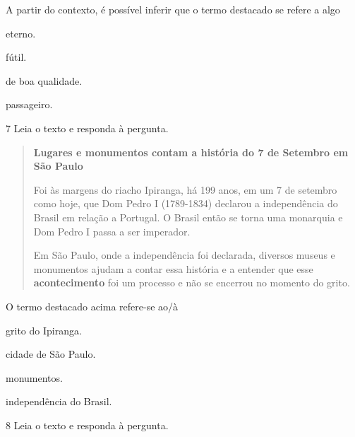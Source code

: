 A partir do contexto, é possível inferir que o termo destacado se
refere a algo

\begin{escolha}
  \item eterno.

  \item fútil.

  \item de boa qualidade.

  \item passageiro.
\end{escolha}

\pagebreak
\num{7} Leia o texto e responda à pergunta.

\begin{quote}
\textbf{Lugares e monumentos contam a história do 7 de Setembro em São
Paulo}

Foi às margens do riacho Ipiranga, há 199 anos, em um 7 de setembro como
hoje, que Dom Pedro I (1789-1834) declarou a independência do Brasil em
relação a Portugal. O Brasil então se torna uma monarquia e Dom Pedro I
passa a ser imperador.

Em São Paulo, onde a independência foi declarada, diversos museus e
monumentos ajudam a contar essa história e a entender que esse
\textbf{acontecimento} foi um processo e não se encerrou no momento do
grito.

\end{quote}

O termo destacado acima refere-se ao/à

\begin{escolha}
  \item grito do Ipiranga.

  \item cidade de São Paulo.

  \item monumentos.

  \item independência do Brasil.
\end{escolha}

\num{8} Leia o texto e responda à pergunta.


